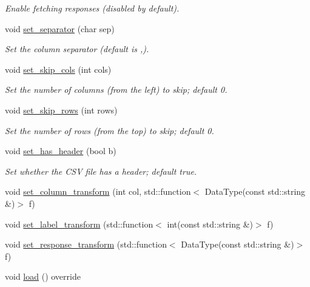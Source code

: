 \begin{DoxyCompactItemize}
\begin{DoxyCompactList}\small\item\em Enable fetching responses (disabled by default). \end{DoxyCompactList}\item 
void \hyperlink{classlbann_1_1csv__reader_a58c71a6b3a82c064b349ae9d995bcffc}{set\+\_\+separator} (char sep)
\begin{DoxyCompactList}\small\item\em Set the column separator (default is \textquotesingle{},\textquotesingle{}). \end{DoxyCompactList}\item 
void \hyperlink{classlbann_1_1csv__reader_a1ab853e9c9a37a1e6c51811bf5be421b}{set\+\_\+skip\+\_\+cols} (int cols)
\begin{DoxyCompactList}\small\item\em Set the number of columns (from the left) to skip; default 0. \end{DoxyCompactList}\item 
void \hyperlink{classlbann_1_1csv__reader_a7ec75f9bbf61073dd205871916578125}{set\+\_\+skip\+\_\+rows} (int rows)
\begin{DoxyCompactList}\small\item\em Set the number of rows (from the top) to skip; default 0. \end{DoxyCompactList}\item 
void \hyperlink{classlbann_1_1csv__reader_abc40f1b5848b1dcaf72cd1b84196c78e}{set\+\_\+has\+\_\+header} (bool b)
\begin{DoxyCompactList}\small\item\em Set whether the C\+SV file has a header; default true. \end{DoxyCompactList}\item 
void \hyperlink{classlbann_1_1csv__reader_a919b0f22b1a78a08a686ac1178560f3d}{set\+\_\+column\+\_\+transform} (int col, std\+::function$<$ Data\+Type(const std\+::string \&)$>$ f)
\item 
void \hyperlink{classlbann_1_1csv__reader_afa41685e0d81ab1b2b8e8739c94873cc}{set\+\_\+label\+\_\+transform} (std\+::function$<$ int(const std\+::string \&)$>$ f)
\item 
void \hyperlink{classlbann_1_1csv__reader_ac68eeea545dc8b2933339a51e55bd27e}{set\+\_\+response\+\_\+transform} (std\+::function$<$ Data\+Type(const std\+::string \&)$>$ f)
\item 
void \hyperlink{classlbann_1_1csv__reader_a7b76b23422db407e8fb039cc11a08bc6}{load} () override

\end{DoxyCompactItemize}
